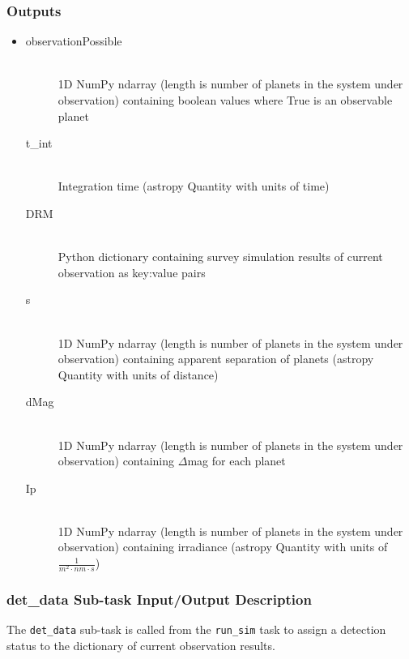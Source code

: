 \documentclass[cleanfoot]{asme2ej}
\begin{document}
\subsubsection*{Outputs}
\begin{itemize}
    \item 
    \begin{description}
        \item[observationPossible] \hfill \\
        1D NumPy ndarray (length is number of planets in the system under observation) containing boolean values where True is an observable planet
        \item[t\_int] \hfill \\
        Integration time (astropy Quantity with units of time)
        \item[DRM] \hfill \\
        Python dictionary containing survey simulation results of current observation as key:value pairs
        \item[s] \hfill \\
        1D NumPy ndarray (length is number of planets in the system under observation) containing apparent separation of planets (astropy Quantity with units of distance)
        \item[dMag] \hfill \\
        1D NumPy ndarray (length is number of planets in the system under observation) containing $ \Delta $mag for each planet
        \item[Ip] \hfill \\
        1D NumPy ndarray (length is number of planets in the system under observation) containing irradiance (astropy Quantity with units of $ \frac{1}{m^2 \cdot nm \cdot s} $)
    \end{description}
\end{itemize}

\subsubsection{det\_data Sub-task Input/Output Description} \label{sec:detdatatask}
The \verb+det_data+ sub-task is called from the \verb+run_sim+ task to assign a detection status to the dictionary of current observation results.
\end{document}
